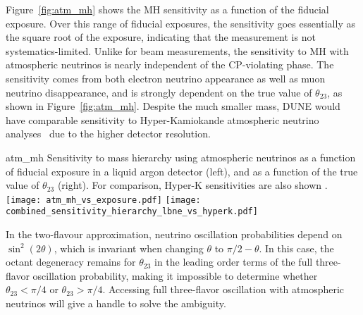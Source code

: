 
Figure~\ref{fig:atm_mh} shows the MH sensitivity as a function of the fiducial exposure. 
Over this range of fiducial exposures, the sensitivity goes essentially as the square 
root of the exposure, indicating that the measurement is not systematics-limited. 
Unlike for beam measurements, the sensitivity to MH with atmospheric neutrinos is 
nearly independent of the CP-violating phase.  The sensitivity comes from both 
electron neutrino appearance as well as muon neutrino disappearance, and is strongly 
dependent on the true value of $\theta_{23}$, as shown in Figure~\ref{fig:atm_mh}.  Despite the
much smaller mass, DUNE would have comparable sensitivity to Hyper-Kamiokande atmospheric 
neutrino analyses~\cite{Kearns:2013lea} due to the higher detector resolution.    

\begin{cdrfigure}{atm_mh}
{Sensitivity to mass hierarchy using atmospheric neutrinos as a function of fiducial 
exposure in a liquid argon detector (left), and as a function of the true value of 
$\theta_{23}$ (right).  For comparison, Hyper-K sensitivities are also shown \cite{Kearns:2013lea}.}  
\texttt{[image: atm\_mh\_vs\_exposure.pdf]}
\texttt{[image: combined\_sensitivity\_hierarchy\_lbne\_vs\_hyperk.pdf]}
\end{cdrfigure}

In the two-flavour approximation, neutrino oscillation probabilities depend on 
$\sin^2(2\theta)$, which is invariant when changing $\theta$ to $\pi/2-\theta$. In this case, the octant 
degeneracy remains for $\theta_{23}$ in the leading order terms of the full 
three-flavor oscillation probability, making it impossible to determine whether $\theta_{23}< \pi/4$ or 
$\theta_{23}> \pi/4$. Accessing full three-flavor oscillation with atmospheric neutrinos 
will give a handle to solve the ambiguity.

